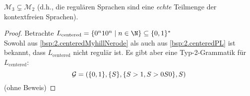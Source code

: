 \begin{lemma}
	$\mathcal{M}_3 \subsetneq \mathcal{M}_2$ (d.h., die regulären Sprachen sind eine \emph{echte} Teilmenge der kontextfreien Sprachen).
\end{lemma}
\begin{proof}
	Betrachte $L_\text{centered}=\{0^n10^n \mid n\in\N \}\subseteq\{0,1\}^*$\\
	Sowohl aus \autoref{bsp:2.centeredMyhillNerode} als auch aus \autoref{bsp:2.centeredPL} ist bekannt, 
	dass $L_\text{centered}$ nicht regulär ist.
	Es gibt aber eine Typ-2-Grammatik für $L_\text{centered}$:
	\[ \mathcal{G} = (\{0,1\}, \{S\}, \{S\->1, S\->0S0 \}, S) \]
	(ohne Beweis)
\end{proof}

\hide{

}




